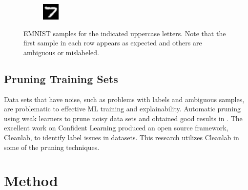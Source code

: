 \documentclass[conference]{IEEEtran}
\begin{document}
\begin{figure}[h]
\begin{subfigure}{.10\textwidth}
        \label{fig:issue_T03}
    \end{subfigure}%
    \begin{subfigure}{.10\textwidth}
        \centering
        \includegraphics[width=.90\textwidth]{./images/issues/T-04.png}
        \label{fig:issue_T04}
    \end{subfigure}
    \caption{EMNIST samples for the indicated uppercase letters.  Note that the first sample in each row appears as expected and others are ambiguous or mislabeled.}
    \label{fig:emnist_samples}
\end{figure}

\subsection{Pruning Training Sets}

Data sets that have noise, such as problems with labels and ambiguous samples,
are problematic to effective ML training and explainability. Automatic pruning
using weak learners to prune noisy data sets and obtained good results in
\cite{angelova05}.  The excellent work on Confident Learning\cite{northcutt2021}
produced an open source framework, Cleanlab, to identify label issues in
datasets.  This research utilizes Cleanlab in some of the pruning techniques.

\section{Method}
\end{document}
